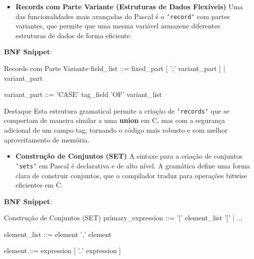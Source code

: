 \documentclass[
	11pt,
	aspectratio=169,
]{beamer}
\begin{document}
  \begin{frame}[fragile]
    \begin{itemize}
      \item \textbf{Records com Parte Variante (Estruturas de Dados Flexíveis)}
        Uma das funcionalidades mais avançadas do Pascal é o \texttt{`record`} com partes variantes,
        que permite que uma mesma variável armazene diferentes estruturas de dados de forma eficiente.
    \end{itemize}

        \textbf{BNF Snippet}:
        \begin{caixaCodigoDracula}{Records com Parte Variante}
field_list ::= fixed_part [ ';' variant_part ] | variant_part

variant_part ::= 'CASE' tag_field 'OF' variant_list
        \end{caixaCodigoDracula}

     \end{frame}

     \begin{frame}
        \begin{exampleblock}{Destaque}
        Esta estrutura gramatical permite a criação de \texttt{`records`}
        que se comportam de maneira similar a uma \textbf{union} em C, mas com a segurança adicional de um campo tag,
        tornando o código mais robusto e com melhor aproveitamento de memória.
    \end{exampleblock}
     \end{frame}

  \begin{frame}[fragile]
    \begin{itemize}
      \item \textbf{Construção de Conjuntos (SET)}
        A sintaxe para a criação de conjuntos \texttt{`sets`} em Pascal é declarativa e de alto nível.
        A gramática define uma forma clara de construir conjuntos, que o compilador traduz para operações bitwise eficientes em C.
    \end{itemize}

        \textbf{BNF Snippet}:
        \begin{caixaCodigoDracula}{Construção de Conjuntos (SET)}
primary_expression ::= '[' element_list ']' | ...

element_list ::= element { ',' element }

element ::= expression [ '..' expression ]
        \end{caixaCodigoDracula}

          \end{frame}
\end{document}
